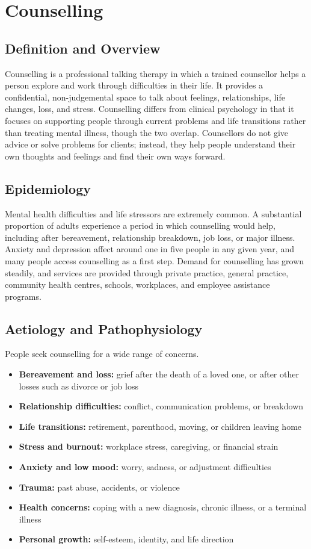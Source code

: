\chapter{Counselling}

\section*{Definition and Overview}
Counselling is a professional talking therapy in which a trained counsellor helps a person explore and work through difficulties in their life. It provides a confidential, non-judgemental space to talk about feelings, relationships, life changes, loss, and stress. Counselling differs from clinical psychology in that it focuses on supporting people through current problems and life transitions rather than treating mental illness, though the two overlap. Counsellors do not give advice or solve problems for clients; instead, they help people understand their own thoughts and feelings and find their own ways forward.

\section*{Epidemiology}
Mental health difficulties and life stressors are extremely common. A substantial proportion of adults experience a period in which counselling would help, including after bereavement, relationship breakdown, job loss, or major illness. Anxiety and depression affect around one in five people in any given year, and many people access counselling as a first step. Demand for counselling has grown steadily, and services are provided through private practice, general practice, community health centres, schools, workplaces, and employee assistance programs.

\section*{Aetiology and Pathophysiology}
People seek counselling for a wide range of concerns.

\begin{itemize}
    \item \textbf{Bereavement and loss:} grief after the death of a loved one, or after other losses such as divorce or job loss
    \item \textbf{Relationship difficulties:} conflict, communication problems, or breakdown
    \item \textbf{Life transitions:} retirement, parenthood, moving, or children leaving home
    \item \textbf{Stress and burnout:} workplace stress, caregiving, or financial strain
    \item \textbf{Anxiety and low mood:} worry, sadness, or adjustment difficulties
    \item \textbf{Trauma:} past abuse, accidents, or violence
    \item \textbf{Health concerns:} coping with a new diagnosis, chronic illness, or a terminal illness
    \item \textbf{Personal growth:} self-esteem, identity, and life direction
\end{itemize}

